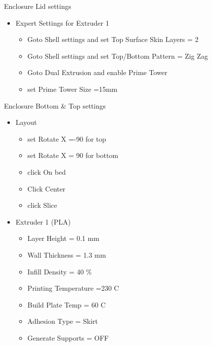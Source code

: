 \begin{subsubsec}{Enclosure Lid settings}
\begin{itemize}
    \item Expert Settings for Extruder 1
    \begin{itemize}
        \item Goto Shell settings and set Top Surface Skin Layers = 2 
        \item Goto Shell settings and set Top/Bottom Pattern = Zig Zag
        \item Goto Dual Extrusion and enable Prime Tower
        \item set Prime Tower Size =15mm
    \end{itemize}
    
\end{itemize}
\end{subsubsec}

\begin{subsubsec}{Enclosure Bottom \& Top settings}
\begin{itemize}
    \item Layout
    \begin{itemize}
        \item set Rotate X =-90 for top
        \item set Rotate X = 90 for bottom
        \item click On bed
        \item Click Center
        \item click Slice
    \end{itemize}
    
    \item Extruder 1 (PLA)
    \begin{itemize}
        \item Layer Height = 0.1 mm
        \item Wall Thickness = 1.3 mm
        \item Infill Density = 40 \%
        \item Printing Temperature =230 C
        \item Build Plate Temp = 60 C
        \item Adhesion Type = Skirt
        \item Generate Supports = OFF
    \end{itemize}
    
\end{itemize}
\end{subsubsec}

